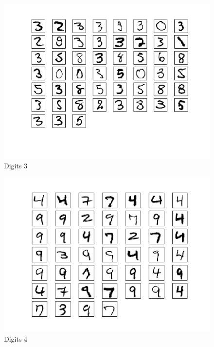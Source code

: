 \documentclass[10pt]{article}
\begin{document}
\begin{figure}
\begin{center}
\includegraphics[scale=0.5]{meansB3}
\caption{Digits 3}
\end{center}
\end{figure}
\begin{figure}
\begin{center}
\includegraphics[scale=0.5]{meansB4}
\caption{Digits 4}
\end{center}
\end{figure}
\end{document}
